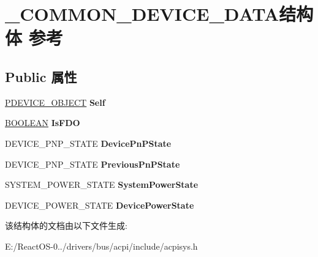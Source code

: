 \hypertarget{struct___c_o_m_m_o_n___d_e_v_i_c_e___d_a_t_a}{}\section{\+\_\+\+C\+O\+M\+M\+O\+N\+\_\+\+D\+E\+V\+I\+C\+E\+\_\+\+D\+A\+T\+A结构体 参考}
\label{struct___c_o_m_m_o_n___d_e_v_i_c_e___d_a_t_a}
\subsection*{Public 属性}
\begin{DoxyCompactItemize}
\item 
\mbox{\label{struct___c_o_m_m_o_n___d_e_v_i_c_e___d_a_t_a_ac5bb9d013f8ffbfb0b8f6f5c6cb1167c}} 
\hyperlink{struct___d_e_v_i_c_e___o_b_j_e_c_t}{P\+D\+E\+V\+I\+C\+E\+\_\+\+O\+B\+J\+E\+CT} {\bfseries Self}
\item 
\mbox{\label{struct___c_o_m_m_o_n___d_e_v_i_c_e___d_a_t_a_a8df407ad8e421a019b2454e3fea2da2c}} 
\hyperlink{_processor_bind_8h_a112e3146cb38b6ee95e64d85842e380a}{B\+O\+O\+L\+E\+AN} {\bfseries Is\+F\+DO}
\item 
\mbox{\label{struct___c_o_m_m_o_n___d_e_v_i_c_e___d_a_t_a_a71921119a3049b3f932b4fba13a372cc}} 
D\+E\+V\+I\+C\+E\+\_\+\+P\+N\+P\+\_\+\+S\+T\+A\+TE {\bfseries Device\+Pn\+P\+State}
\item 
\mbox{\label{struct___c_o_m_m_o_n___d_e_v_i_c_e___d_a_t_a_a73dccc247107a801a3151e21b9c93378}} 
D\+E\+V\+I\+C\+E\+\_\+\+P\+N\+P\+\_\+\+S\+T\+A\+TE {\bfseries Previous\+Pn\+P\+State}
\item 
\mbox{\label{struct___c_o_m_m_o_n___d_e_v_i_c_e___d_a_t_a_a2d9230e687ae98c425253c2420b7bf5c}} 
S\+Y\+S\+T\+E\+M\+\_\+\+P\+O\+W\+E\+R\+\_\+\+S\+T\+A\+TE {\bfseries System\+Power\+State}
\item 
\mbox{\label{struct___c_o_m_m_o_n___d_e_v_i_c_e___d_a_t_a_a33216422f231b9b42d10133f1c880647}} 
D\+E\+V\+I\+C\+E\+\_\+\+P\+O\+W\+E\+R\+\_\+\+S\+T\+A\+TE {\bfseries Device\+Power\+State}
\end{DoxyCompactItemize}


该结构体的文档由以下文件生成\+:\begin{DoxyCompactItemize}
\item 
E\+:/\+React\+O\+S-\/0../drivers/bus/acpi/include/acpisys.\+h\end{DoxyCompactItemize}
